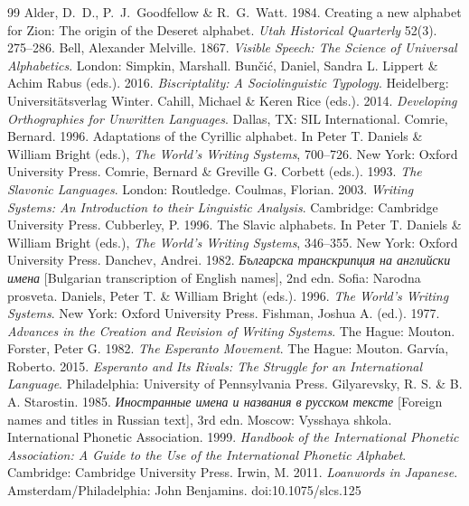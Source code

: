 \documentclass[11pt]{article}
\begin{document}
\begin{thebibliography}{99}
 Alder, D.~D., P.~J.~Goodfellow \& R.~G.~Watt. 1984. Creating a new alphabet for Zion: The origin of the Deseret alphabet. \emph{Utah Historical Quarterly} 52(3). 275--286.
 Bell, Alexander Melville. 1867. \emph{Visible Speech: The Science of Universal Alphabetics}. London: Simpkin, Marshall.
 Bun\v{c}i\'c, Daniel, Sandra L. Lippert \& Achim Rabus (eds.). 2016. \emph{Biscriptality: A Sociolinguistic Typology}. Heidelberg: Universit\"atsverlag Winter.
 Cahill, Michael \& Keren Rice (eds.). 2014. \emph{Developing Orthographies for Unwritten Languages}. Dallas, TX: SIL International.
 Comrie, Bernard. 1996. Adaptations of the Cyrillic alphabet. In Peter T. Daniels \& William Bright (eds.), \emph{The World's Writing Systems}, 700--726. New York: Oxford University Press.
 Comrie, Bernard \& Greville G. Corbett (eds.). 1993. \emph{The Slavonic Languages}. London: Routledge.
 Coulmas, Florian. 2003. \emph{Writing Systems: An Introduction to their Linguistic Analysis}. Cambridge: Cambridge University Press.
 Cubberley, P. 1996. The Slavic alphabets. In Peter T. Daniels \& William Bright (eds.), \emph{The World's Writing Systems}, 346--355. New York: Oxford University Press.
 Danchev, Andrei. 1982. \emph{Българска транскрипция на английски имена} [Bulgarian transcription of English names], 2nd edn. Sofia: Narodna prosveta.
 Daniels, Peter T. \& William Bright (eds.). 1996. \emph{The World's Writing Systems}. New York: Oxford University Press.
 Fishman, Joshua A. (ed.). 1977. \emph{Advances in the Creation and Revision of Writing Systems}. The Hague: Mouton.
 Forster, Peter G. 1982. \emph{The Esperanto Movement}. The Hague: Mouton.
 Garv\'ia, Roberto. 2015. \emph{Esperanto and Its Rivals: The Struggle for an International Language}. Philadelphia: University of Pennsylvania Press.
 Gilyarevsky, R. S. \& B. A. Starostin. 1985. \emph{Иностранные имена и названия в русском тексте} [Foreign names and titles in Russian text], 3rd edn. Moscow: Vysshaya shkola.
 International Phonetic Association. 1999. \emph{Handbook of the International Phonetic Association: A Guide to the Use of the International Phonetic Alphabet}. Cambridge: Cambridge University Press.
 Irwin, M. 2011. \emph{Loanwords in Japanese}. Amsterdam/Philadelphia: John Benjamins. doi:10.1075/slcs.125

\end{thebibliography}
\end{document}
